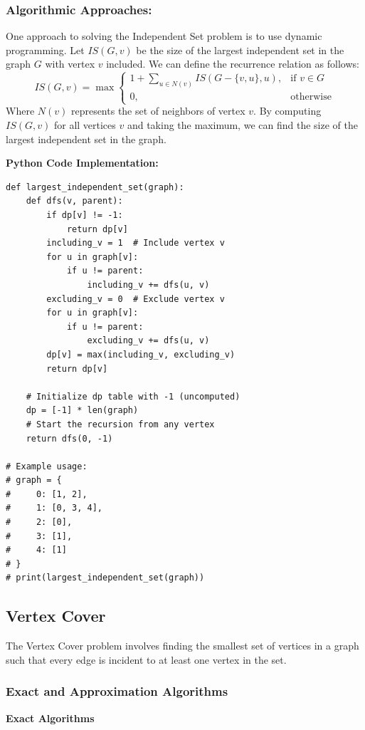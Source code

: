 \documentclass[12pt]{book} %
\begin{document}
\subsubsection{Algorithmic Approaches:} 
One approach to solving the Independent Set problem is to use dynamic programming. Let \(IS(G, v)\) be the size of the largest independent set in the graph \(G\) with vertex \(v\) included. We can define the recurrence relation as follows:
\[
IS(G, v) = \max\left\{
\begin{array}{ll}
1 + \sum_{u \in N(v)} IS(G - \{v, u\}, u), & \text{if } v \in G \\
0, & \text{otherwise}
\end{array}
\right.
\]
Where \(N(v)\) represents the set of neighbors of vertex \(v\). By computing \(IS(G, v)\) for all vertices \(v\) and taking the maximum, we can find the size of the largest independent set in the graph.

\textbf{Python Code Implementation:} 
\FloatBarrier
\begin{lstlisting}
def largest_independent_set(graph):
    def dfs(v, parent):
        if dp[v] != -1:
            return dp[v]
        including_v = 1  # Include vertex v
        for u in graph[v]:
            if u != parent:
                including_v += dfs(u, v)
        excluding_v = 0  # Exclude vertex v
        for u in graph[v]:
            if u != parent:
                excluding_v += dfs(u, v)
        dp[v] = max(including_v, excluding_v)
        return dp[v]

    # Initialize dp table with -1 (uncomputed)
    dp = [-1] * len(graph)
    # Start the recursion from any vertex
    return dfs(0, -1)

# Example usage:
# graph = {
#     0: [1, 2],
#     1: [0, 3, 4],
#     2: [0],
#     3: [1],
#     4: [1]
# }
# print(largest_independent_set(graph))

\end{lstlisting}

\subsection{Vertex Cover}

The Vertex Cover problem involves finding the smallest set of vertices in a graph such that every edge is incident to at least one vertex in the set.

\subsubsection{Exact and Approximation Algorithms} 
\textbf{Exact Algorithms}
\end{document}
